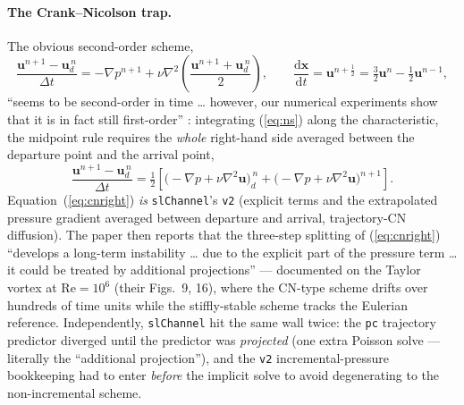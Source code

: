 \documentclass[11pt,a4paper]{article}
\newcommand{\bu}{\mathbf{u}}
\newcommand{\bx}{\mathbf{x}}
\newcommand{\dd}{\mathrm{d}}
\begin{document}
\paragraph{The Crank--Nicolson trap.} The obvious second-order scheme,
\begin{equation}
\frac{\bu^{n+1}-\bu_d^{\,n}}{\Delta t}
= -\nabla p^{n+1} + \nu\nabla^2\!\left(\frac{\bu^{n+1}+\bu_d^{\,n}}{2}\right),
\qquad
\frac{\dd\bx}{\dd t} = \bu^{n+\frac12} = \tfrac32\bu^{n}-\tfrac12\bu^{n-1},
\label{eq:cnwrong}
\end{equation}
``seems to be second-order in time \dots{} however, our numerical experiments
show that it is in fact still first-order'' \cite{xiu01}: integrating
(\ref{eq:ns}) along the characteristic, the midpoint rule requires the
\emph{whole} right-hand side averaged between the departure point and the
arrival point,
\begin{equation}
\frac{\bu^{n+1}-\bu_d^{\,n}}{\Delta t}
= \tfrac12\left[\big(-\nabla p + \nu\nabla^2\bu\big)_d^{\,n}
              + \big(-\nabla p + \nu\nabla^2\bu\big)^{n+1}\right].
\label{eq:cnright}
\end{equation}
Equation~(\ref{eq:cnright}) \emph{is} \texttt{slChannel}'s \texttt{v2}
(explicit terms and the extrapolated pressure gradient averaged between
departure and arrival, trajectory-CN diffusion). The paper then reports that
the three-step splitting of (\ref{eq:cnright}) ``develops a long-term
instability \dots{} due to the explicit part of the pressure term \dots{} it
could be treated by additional projections'' --- documented on the Taylor
vortex at $\mathrm{Re}=10^6$ (their Figs.~9, 16), where the CN-type scheme
drifts over hundreds of time units while the stiffly-stable scheme tracks the
Eulerian reference. Independently, \texttt{slChannel} hit the same wall
twice: the \texttt{pc} trajectory predictor diverged until the predictor was
\emph{projected} (one extra Poisson solve --- literally the ``additional
projection''), and the \texttt{v2} incremental-pressure bookkeeping had to
enter \emph{before} the implicit solve to avoid degenerating to the
non-incremental scheme.
\end{document}
